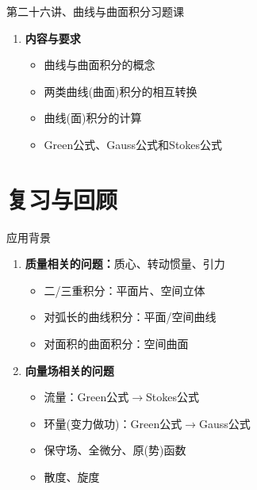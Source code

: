 
\begin{frame}{第二十六讲、曲线与曲面积分习题课}
	\linespread{1.5}
	\begin{enumerate}
	  \item {\bf 内容与要求}
	  \begin{itemize}
		\item 曲线与曲面积分的概念
		\item 两类曲线(曲面)积分的相互转换
		\item 曲线(面)积分的计算
		\item Green公式、Gauss公式和Stokes公式
	  \vspace{1em}
	  \end{itemize}
	\end{enumerate}
\end{frame}

\section{复习与回顾}

\begin{frame}{应用背景}
	\linespread{1.5}
	\begin{enumerate}
	  \item {\bf 质量相关的问题：}质心、转动惯量、引力
	  \begin{itemize}
	    \item 二/三重积分：平面片、空间立体
	    \item 对弧长的曲线积分：平面/空间曲线
	    \item 对面积的曲面积分：空间曲面
	  \end{itemize}
	  \item {\bf 向量场相关的问题}
	  \begin{itemize}
	    \item 流量：Green公式$\to$Stokes公式
	    \item 环量(变力做功)：Green公式$\to$Gauss公式
	    \item 保守场、全微分、原(势)函数
	    \item 散度、旋度
	  \end{itemize}
	\end{enumerate}
\end{frame}

